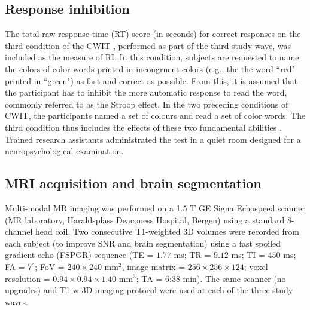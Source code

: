 \documentclass[10pt,letterpaper]{article}
\begin{document}
 
\subsection{Response inhibition}

The total raw response-time (RT) score (in seconds) for correct responses on the third condition of the CWIT \cite{Delis2001}, performed as part of the third study wave, was included as the measure of RI. In this condition, subjects are requested to name the colors of color-words printed in incongruent colors (e.g., the the word ``red" printed in ``green") as fast and correct as possible. 
From this, it is assumed that the participant has to inhibit the more automatic response to read the word, commonly referred to as the Stroop effect. 
In the two preceding conditions of CWIT, the participants named a set of colours and read a set of color words. The third condition thus includes the effects of these two fundamental abilities \cite{Adolfsdottir2014}.   
Trained research assistants administrated the test in a quiet room designed for a neuropsychological examination.   


\subsection{MRI acquisition and brain segmentation}

Multi-modal MR imaging was performed on a 1.5 T GE Signa Echospeed scanner (MR laboratory, Haraldsplass Deaconess Hospital, Bergen) 
using a standard 8-channel head coil. 
Two consecutive T1-weighted 3D volumes were recorded from each subject (to improve SNR and brain segmentation) 
using a fast spoiled gradient echo (FSPGR) sequence 
(TE = $1.77$ ms; TR = $9.12$ ms; TI = $450$ ms; FA = $7^{\circ}$; FoV = $240 \times 240$ mm$^2$, image matrix = $256 \times 256 \times 124$;
voxel resolution = $0.94 \times 0.94 \times 1.40$ mm$^3$; 
TA = $6$:$38$ min). 
The same scanner (no upgrades) and T1-w 3D imaging protocol were used at each of the three study waves.\\
\end{document}
